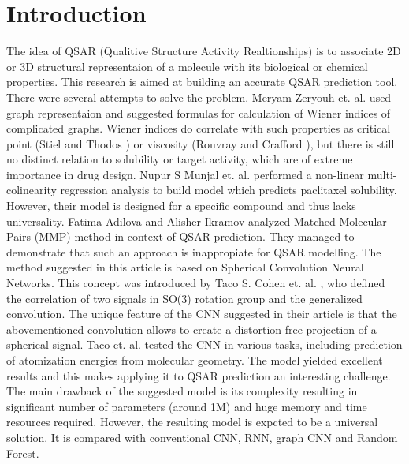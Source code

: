 \documentclass[12pt,twoside]{article}
\begin{document}
\section{Introduction}
    The idea of QSAR (Qualitive Structure Activity Realtionships) is to associate 2D or 3D structural representaion of a molecule with its biological or chemical properties. 
    This research is aimed at building an accurate QSAR prediction tool. There were several attempts to solve the problem. Meryam Zeryouh et. al. \cite{Wiener15} used graph representaion and suggested formulas for calculation of Wiener indices of complicated graphs. 
    Wiener indices do correlate with such properties as critical point (Stiel and Thodos \cite{Critical}) or viscosity (Rouvray and Crafford \cite{Visc}), but there is still no distinct relation to solubility or target activity, which are of extreme importance in drug design. 
    Nupur S Munjal et. al. \cite{Paclitaxel16} performed a non-linear multi-colinearity regression analysis to build model which predicts paclitaxel solubility. However, their model is designed for a specific compound and thus lacks universality. 
    Fatima Adilova and Alisher Ikramov \cite{MMP17} analyzed Matched Molecular Pairs (MMP) method in context of QSAR prediction. They managed to demonstrate that such an approach is inappropiate for QSAR modelling. 
\newline
    The method suggested in this article is based on Spherical Convolution Neural Networks. This concept was introduced by Taco S. Cohen et. al. \cite{SCNN}, who defined the correlation of two signals in SO(3) rotation group and the generalized convolution. 
    The unique feature of the CNN suggested in their article is that the abovementioned convolution allows to create a distortion-free projection of a spherical signal.
     Taco et. al. tested the CNN in various tasks, including prediction of atomization energies from molecular geometry. The model yielded excellent results and this makes applying it to QSAR prediction an interesting challenge. 
\newline
    The main drawback of the suggested model is its complexity resulting in significant number of parameters (around 1M) and huge memory and time resources required. 
    However, the resulting model is expcted to be a universal solution. It is compared with conventional CNN, RNN, graph CNN and Random Forest.


\begin{thebibliography}{6}
\end{thebibliography}
\end{document}
